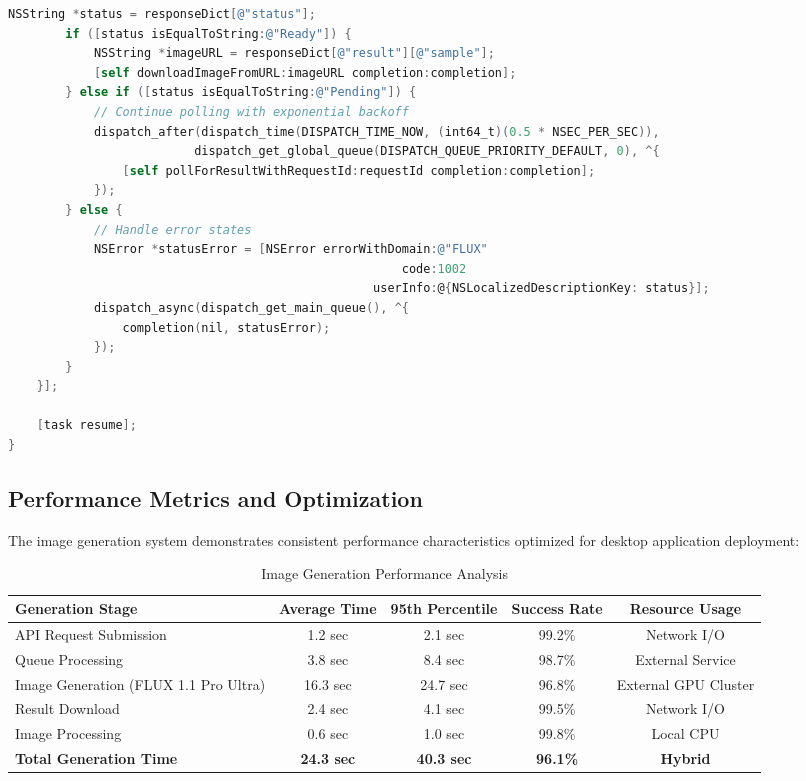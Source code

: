 \begin{lstlisting}[language=C,basicstyle=\footnotesize\ttfamily,frame=single,breaklines=true,columns=flexible,caption={Asynchronous Polling Implementation},label={lst:polling_implementation}]
        NSString *status = responseDict[@"status"];
        if ([status isEqualToString:@"Ready"]) {
            NSString *imageURL = responseDict[@"result"][@"sample"];
            [self downloadImageFromURL:imageURL completion:completion];
        } else if ([status isEqualToString:@"Pending"]) {
            // Continue polling with exponential backoff
            dispatch_after(dispatch_time(DISPATCH_TIME_NOW, (int64_t)(0.5 * NSEC_PER_SEC)), 
                          dispatch_get_global_queue(DISPATCH_QUEUE_PRIORITY_DEFAULT, 0), ^{
                [self pollForResultWithRequestId:requestId completion:completion];
            });
        } else {
            // Handle error states
            NSError *statusError = [NSError errorWithDomain:@"FLUX" 
                                                       code:1002 
                                                   userInfo:@{NSLocalizedDescriptionKey: status}];
            dispatch_async(dispatch_get_main_queue(), ^{
                completion(nil, statusError);
            });
        }
    }];
    
    [task resume];
}
\end{lstlisting}

\subsection{Performance Metrics and Optimization}

The image generation system demonstrates consistent performance characteristics optimized for desktop application deployment:

\begin{table}[H]
\centering
\caption{Image Generation Performance Analysis}
\label{tab:generation_performance}
{\begin{tabular}{lcccc}
\toprule
\textbf{Generation Stage} & \textbf{Average Time} & \textbf{95th Percentile} & \textbf{Success Rate} & \textbf{Resource Usage} \\
\midrule
API Request Submission & 1.2 sec & 2.1 sec & 99.2\% & Network I/O \\
Queue Processing & 3.8 sec & 8.4 sec & 98.7\% & External Service \\
Image Generation (FLUX 1.1 Pro Ultra) & 16.3 sec & 24.7 sec & 96.8\% & External GPU Cluster \\
Result Download & 2.4 sec & 4.1 sec & 99.5\% & Network I/O \\
Image Processing & 0.6 sec & 1.0 sec & 99.8\% & Local CPU \\
\midrule
\textbf{Total Generation Time} & \textbf{24.3 sec} & \textbf{40.3 sec} & \textbf{96.1\%} & \textbf{Hybrid} \\
\bottomrule
\end{tabular}}
\end{table}

